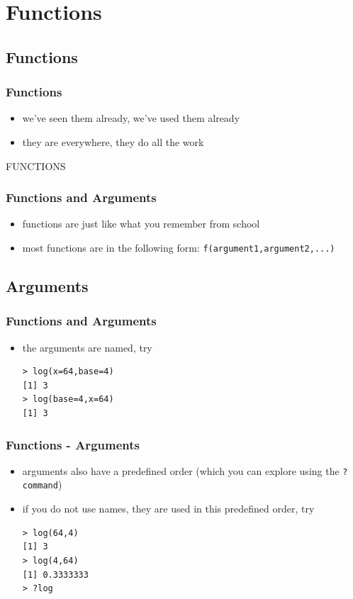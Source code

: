 \documentclass[xcolor={table},c]{beamer}
\begin{document}
\section{Functions}
\subsection{Functions}
\begin{frame}\frametitle{Functions}
  \begin{itemize}
    \item we've seen them already, we've used them already
    \item they are everywhere, they do all the work
   \end{itemize}
\begin{center}
\LARGE{FUNCTIONS}
\end{center}
\end{frame}

\begin{frame}[fragile]\frametitle{Functions and Arguments}
  \begin{itemize}
  \item functions are just like what you remember from school
    \item most functions are in the following form: \texttt{f(argument1,argument2,...)}
   \end{itemize}
\end{frame}

\subsection{Arguments}

\begin{frame}[fragile]\frametitle{Functions and Arguments}
  \begin{itemize}
    \item the arguments are named, try
\begin{verbatim}
> log(x=64,base=4)
[1] 3
> log(base=4,x=64)
[1] 3
\end{verbatim}
   \end{itemize}
\end{frame}

\begin{frame}[fragile]\frametitle{Functions - Arguments}
  \begin{itemize}
  \item arguments also have a predefined order (which you can explore using the \texttt{?command})
  \item if you do not use names, they are used in this predefined order, try
\begin{verbatim}
> log(64,4)
[1] 3 
> log(4,64)
[1] 0.3333333
> ?log
\end{verbatim}
   \end{itemize}
\end{frame}
\end{document}
